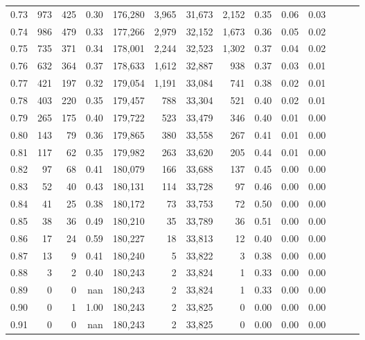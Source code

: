 \begin{tabular}{rrrrrrrrrrrrrr}
0.73 &    973 &    425 &  0.30 &  176,280 &    3,965 &  31,673 &   2,152 &  0.35 &  0.06 &      0.03 \\
0.74 &    986 &    479 &  0.33 &  177,266 &    2,979 &  32,152 &   1,673 &  0.36 &  0.05 &      0.02 \\
0.75 &    735 &    371 &  0.34 &  178,001 &    2,244 &  32,523 &   1,302 &  0.37 &  0.04 &      0.02 \\
0.76 &    632 &    364 &  0.37 &  178,633 &    1,612 &  32,887 &     938 &  0.37 &  0.03 &      0.01 \\
0.77 &    421 &    197 &  0.32 &  179,054 &    1,191 &  33,084 &     741 &  0.38 &  0.02 &      0.01 \\
0.78 &    403 &    220 &  0.35 &  179,457 &      788 &  33,304 &     521 &  0.40 &  0.02 &      0.01 \\
0.79 &    265 &    175 &  0.40 &  179,722 &      523 &  33,479 &     346 &  0.40 &  0.01 &      0.00 \\
0.80 &    143 &     79 &  0.36 &  179,865 &      380 &  33,558 &     267 &  0.41 &  0.01 &      0.00 \\
0.81 &    117 &     62 &  0.35 &  179,982 &      263 &  33,620 &     205 &  0.44 &  0.01 &      0.00 \\
0.82 &     97 &     68 &  0.41 &  180,079 &      166 &  33,688 &     137 &  0.45 &  0.00 &      0.00 \\
0.83 &     52 &     40 &  0.43 &  180,131 &      114 &  33,728 &      97 &  0.46 &  0.00 &      0.00 \\
0.84 &     41 &     25 &  0.38 &  180,172 &       73 &  33,753 &      72 &  0.50 &  0.00 &      0.00 \\
0.85 &     38 &     36 &  0.49 &  180,210 &       35 &  33,789 &      36 &  0.51 &  0.00 &      0.00 \\
0.86 &     17 &     24 &  0.59 &  180,227 &       18 &  33,813 &      12 &  0.40 &  0.00 &      0.00 \\
0.87 &     13 &      9 &  0.41 &  180,240 &        5 &  33,822 &       3 &  0.38 &  0.00 &      0.00 \\
0.88 &      3 &      2 &  0.40 &  180,243 &        2 &  33,824 &       1 &  0.33 &  0.00 &      0.00 \\
0.89 &      0 &      0 &   nan &  180,243 &        2 &  33,824 &       1 &  0.33 &  0.00 &      0.00 \\
0.90 &      0 &      1 &  1.00 &  180,243 &        2 &  33,825 &       0 &  0.00 &  0.00 &      0.00 \\
0.91 &      0 &      0 &   nan &  180,243 &        2 &  33,825 &       0 &  0.00 &  0.00 &      0.00 \\

\end{tabular}
